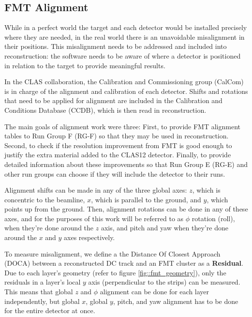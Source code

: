 \subsection{FMT Alignment} \label{ssec::fmtalignment}
    While in a perfect world the target and each detector would be installed precisely where they are needed, in the real world there is an unavoidable misalignment in their positions.
    This misalignment needs to be addressed and included into reconstruction:
    the software needs to be aware of where a detector is positioned in relation to the target to provide meaningful results.

    In the CLAS collaboration, the Calibration and Commissioning group (CalCom) is in charge of the alignment and calibration of each detector.
    Shifts and rotations that need to be applied for alignment are included in the Calibration and Conditions Database (CCDB), which is then read in reconstruction. %

    The main goals of alignment work were three:
    First, to provide FMT alignment tables to Run Group F (RG-F) so that they may be used in reconstruction.
    Second, to check if the resolution improvement from FMT is good enough to justify the extra material added to the CLAS12 detector.
    Finally, to provide detailed information about these improvements so that Run Group E (RG-E) and other run groups can choose if they will include the detector to their runs.

    Alignment shifts can be made in any of the three global axes:
    $z$, which is concentric to the beamline, $x$, which is parallel to the ground, and $y$, which points up from the ground.
    Then, alignment rotations can be done in any of these axes, and for the purposes of this work will be referred to as $\phi$ rotation (roll), when they're done around the $z$ axis, and pitch and yaw when they're done around the $x$ and $y$ axes respectively.

    To measure misalignment, we define a the Distance Of Closest Approach (DOCA) between a reconstructed DC track and an FMT cluster as a \textbf{Residual}.
    Due to each layer's geometry (refer to figure \ref{fig::fmt_geometry}), only the residuals in a layer's local $y$ axis (perpendicular to the strips) can be measured.
    This means that global $z$ and $\phi$ alignment can be done for each layer independently, but global $x$, global $y$, pitch, and yaw alignment has to be done for the entire detector at once.

